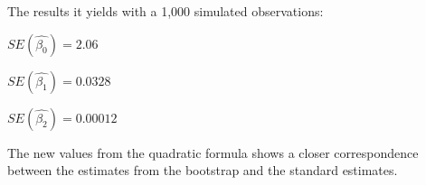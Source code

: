 The results it yields with a 1,000 simulated observations:

\begin{center}
	$SE(\hat{\beta_0}) = 2.06$
\end{center}
\begin{center}
	$SE(\hat{\beta_1}) = 0.0328$
\end{center}
\begin{center}
	$SE(\hat{\beta_2}) = 0.00012$
\end{center}

The new values from the quadratic formula shows a closer correspondence between the estimates from the bootstrap and the standard estimates.